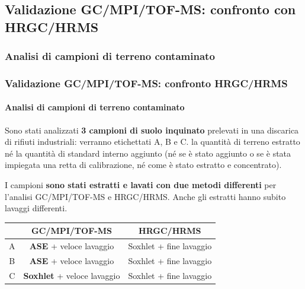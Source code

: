 \subsection{Validazione GC/MPI/TOF-MS: confronto con HRGC/HRMS}\subsubsection{Analisi di campioni di terreno contaminato}\begin{frame}\frametitle{Validazione GC/MPI/TOF-MS: confronto HRGC/HRMS}\framesubtitle{Analisi di campioni di terreno contaminato}


Sono stati analizzati {\bf 3 campioni di suolo inquinato} prelevati in una discarica di rifiuti industriali: verranno etichettati A, B e C.  la quantità di terreno estratto né la quantità di standard interno aggiunto (né se è stato aggiunto o se è stata impiegata una retta di calibrazione, né come è stato estratto e concentrato).\pause

I campioni {\bf sono stati estratti e lavati con due metodi differenti} per l'analisi GC/MPI/TOF-MS e HRGC/HRMS. Anche gli estratti hanno subito lavaggi differenti.

\begin{center}
   \begin{tabular}{c | c c}
& GC/MPI/TOF-MS & HRGC/HRMS \\
\hline
A & {\bf ASE} + veloce lavaggio & Soxhlet + fine lavaggio \\
B & {\bf ASE} + veloce lavaggio & Soxhlet + fine lavaggio  \\
C & {\bf Soxhlet} + veloce lavaggio &  Soxhlet + fine lavaggio 
   \end{tabular}
  \end{center}

\end{frame}
\logo{}
